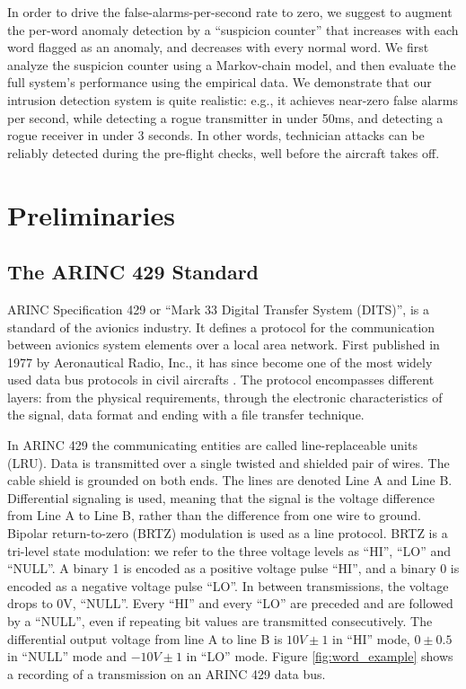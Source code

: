 \documentclass[english]{llncs}
\newcommand{\level}[1]{\section{#1}}
\newcommand{\sublevel}[1]{\subsection{#1}}
\newcommand{\level}[1]{\chapter{#1}}
\newcommand{\sublevel}[1]{\section{#1}}
\begin{document}
  In order to drive the false-alarms-per-second rate to zero, we suggest to augment the per-word anomaly detection by a ``suspicion counter'' that increases with each word flagged as an anomaly, and decreases with every normal word. We first analyze the suspicion counter using a Markov-chain model, and then evaluate the full system's performance using the empirical data. 
  We demonstrate that our intrusion detection system is quite realistic: e.g., it achieves near-zero false alarms per second, while detecting a rogue transmitter in under 50ms, and detecting a rogue receiver in under 3 seconds. In other words, technician attacks can be reliably detected during the pre-flight checks, well before the aircraft takes off.
  
\vspace*{-1.5ex} %
\level{Preliminaries} \label{Preliminaries}
\vspace*{-1ex} %
\sublevel{The ARINC 429 Standard}
  ARINC Specification 429 \cite{arinc2004arinc429} or ``Mark 33 Digital Transfer System (DITS)'', is a standard of the avionics industry. It defines a protocol for the communication between avionics system elements over a local area network. First published in 1977 by Aeronautical Radio, Inc., it has since become one of the most widely used data bus protocols in civil aircrafts \cite{MoirIan2013DBN}. The protocol encompasses different layers: from the physical requirements, through the electronic characteristics of the signal, data format and ending with a file transfer technique.  

  In ARINC 429 the communicating entities are called line-replaceable units (LRU). Data is transmitted over a single twisted and shielded pair of wires. The cable shield is grounded on both ends. The lines are denoted Line A and Line B. Differential signaling is used, meaning that the signal is the voltage difference from Line A to Line B, rather than the difference from one wire to ground. Bipolar return-to-zero (BRTZ) modulation is used as a line protocol. BRTZ is a tri-level state modulation: we refer to the three voltage levels as ``HI'', ``LO'' and ``NULL''. A binary 1 is encoded as a positive voltage pulse ``HI'', and a binary 0 is encoded as a negative voltage pulse ``LO''. In between transmissions, the voltage drops to 0V, ``NULL''. Every ``HI'' and every ``LO'' are preceded and are followed by a ``NULL'', even if repeating bit values are transmitted consecutively. The differential output voltage from line A to line B is $10V \pm 1$ in ``HI'' mode, $0 \pm 0.5$ in ``NULL'' mode and $-10V \pm 1$ in ``LO'' mode.  Figure \ref{fig:word_example} shows a recording of a transmission on an ARINC 429 data bus.
  
\end{document}
